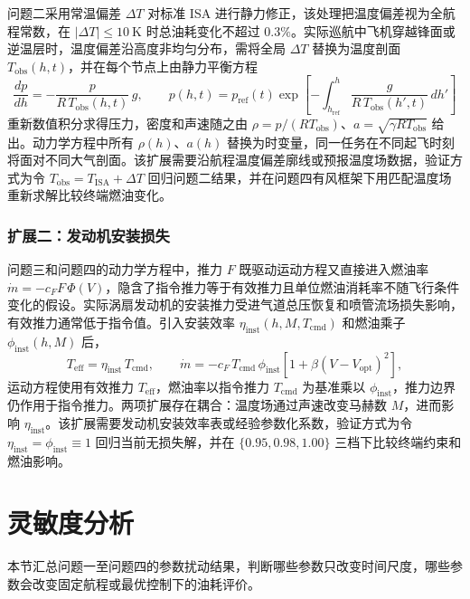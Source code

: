 \documentclass[withoutpreface,bwprint]{cumcmthesis}
\begin{document}
问题二采用常温偏差 $\Delta T$ 对标准 ISA 进行静力修正，该处理把温度偏差视为全航程常数，在 $|\Delta T|\leq10\ \mathrm{K}$ 时总油耗变化不超过 $0.3\%$。实际巡航中飞机穿越锋面或逆温层时，温度偏差沿高度非均匀分布，需将全局 $\Delta T$ 替换为温度剖面 $T_{\mathrm{obs}}(h,t)$，并在每个节点上由静力平衡方程
\begin{equation}
\frac{dp}{dh}=-\frac{p}{R\,T_{\mathrm{obs}}(h,t)}\,g,\qquad
p(h,t)=p_{\mathrm{ref}}(t)\exp\!\left[-\int_{h_{\mathrm{ref}}}^{h}\frac{g}{R\,T_{\mathrm{obs}}(h',t)}\,dh'\right]
\label{eq:ext1_hydrostatic}
\end{equation}
重新数值积分求得压力，密度和声速随之由 $\rho=p/(RT_{\mathrm{obs}})$、$a=\sqrt{\gamma RT_{\mathrm{obs}}}$ 给出。动力学方程中所有 $\rho(h)$、$a(h)$ 替换为时变量，同一任务在不同起飞时刻将面对不同大气剖面。该扩展需要沿航程温度偏差廓线或预报温度场数据，验证方式为令 $T_{\mathrm{obs}}=T_{\mathrm{ISA}}+\Delta T$ 回归问题二结果，并在问题四有风框架下用匹配温度场重新求解比较终端燃油变化。

\subsubsection{扩展二：发动机安装损失}

问题三和问题四的动力学方程中，推力 $F$ 既驱动运动方程又直接进入燃油率 $\dot m=-c_FF\,\Phi(V)$，隐含了指令推力等于有效推力且单位燃油消耗率不随飞行条件变化的假设。实际涡扇发动机的安装推力受进气道总压恢复和喷管流场损失影响，有效推力通常低于指令值。引入安装效率 $\eta_{\mathrm{inst}}(h,M,T_{\mathrm{cmd}})$ 和燃油乘子 $\phi_{\mathrm{inst}}(h,M)$ 后，
\begin{equation}
T_{\mathrm{eff}}=\eta_{\mathrm{inst}}\,T_{\mathrm{cmd}},\qquad
\dot m=-c_F\,T_{\mathrm{cmd}}\,\phi_{\mathrm{inst}}\left[1+\beta(V-V_{\mathrm{opt}})^2\right],
\label{eq:ext2_inst}
\end{equation}
运动方程使用有效推力 $T_{\mathrm{eff}}$，燃油率以指令推力 $T_{\mathrm{cmd}}$ 为基准乘以 $\phi_{\mathrm{inst}}$，推力边界仍作用于指令推力。两项扩展存在耦合：温度场通过声速改变马赫数 $M$，进而影响 $\eta_{\mathrm{inst}}$。该扩展需要发动机安装效率表或经验参数化系数，验证方式为令 $\eta_{\mathrm{inst}}=\phi_{\mathrm{inst}}\equiv1$ 回归当前无损失解，并在 $\{0.95,0.98,1.00\}$ 三档下比较终端约束和燃油影响。

\section{灵敏度分析}

本节汇总问题一至问题四的参数扰动结果，判断哪些参数只改变时间尺度，哪些参数会改变固定航程或最优控制下的油耗评价。
\end{document}
